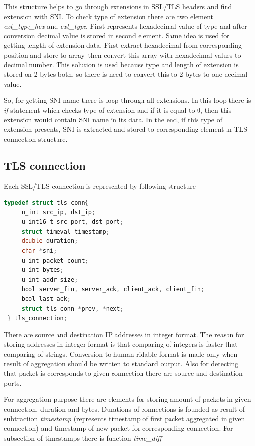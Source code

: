 \documentclass[12pt,a4paper]{article}
\begin{document}
    This structure helps to go through extensions in SSL/TLS headers and find extension with SNI.
    To check type of extension there are two element \textit{ext\_type\_hex} and \textit{ext\_type}.
    First represents hexadecimal value of type and after conversion decimal value is stored in 
    second element. Same idea is used for getting length of extension data. First extract hexadecimal
    from corresponding position and store to array, then convert this array with hexadecimal values 
    to decimal number. This solution is used because type and length of extension is stored on 2 bytes
    both, so there is need to convert this to 2 bytes to one decimal value.

    So, for getting SNI name there is loop through all extensions. In this loop there is \textit{if}
    statement which checks type of extension and if it is equal to 0, then this extension would contain
    SNI name in its data. In the end, if this type of extension presents, SNI is extracted and stored 
    to corresponding element in TLS connection structure.
    
    \subsection{TLS connection}
    Each SSL/TLS connection is represented by following structure
    \begin{lstlisting}[language=C]
 typedef struct tls_conn{
     u_int src_ip, dst_ip;
     u_int16_t src_port, dst_port;
     struct timeval timestamp;
     double duration;
     char *sni;
     u_int packet_count;
     u_int bytes;
     u_int addr_size;
     bool server_fin, server_ack, client_ack, client_fin;
     bool last_ack;
     struct tls_conn *prev, *next;
 } tls_connection;
    \end{lstlisting}

    There are source and destination IP addresses in integer format. The reason for storing addresses 
    in integer format is that comparing of integers is faster that comparing of strings. Conversion 
    to human ridable format is made only when result of aggregation should be written to standard 
    output. Also for detecting that packet is corresponds to given connection there are source and
    destination ports. 

    For aggregation purpose there are elements for storing amount of packets in given connection,
    duration and bytes. Durations of connections is founded as result of subtraction \textit{timestamp} 
    (represents timestamp of first packet aggregated in given connection) and timestamp of new packet
    for corresponding connection. For subsection of timestamps there is function \textit{time\_diff} 
\end{document}
